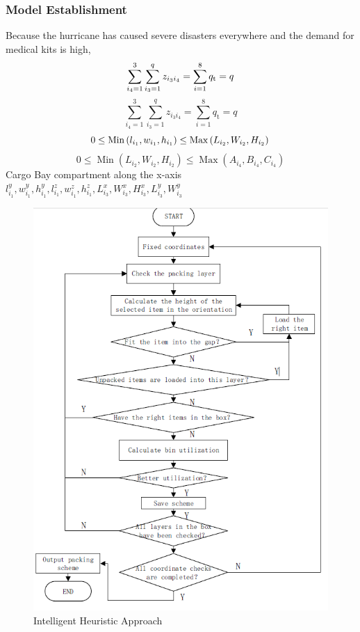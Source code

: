 \documentclass[a4paper,12pt]{article}
\begin{document}
	\subsubsection{Model Establishment}
	Because the hurricane has caused severe disasters everywhere and the demand for medical
	kits is high,
	\begin{equation}
	\sum_{i_{4}=1}^{3} \sum_{i_{3}=1}^{q} z_{i_{3} i_{4}}=\sum_{i=1}^{8} q_{\mathrm{t}}=q\\
	\end{equation}
	\begin{equation}
	\sum_{i_{4}=1}^{3} \sum_{i_{3}=1}^{q} z_{i_{3} i_{4}}=\sum_{i=1}^{8} q_{\mathrm{t}}=q
	\end{equation}
		\begin{equation}
		0 \leq \operatorname{Min}\left(l_{i_{1}}, w_{i_{1}}, h_{i_{1}}\right) \leq \operatorname{Max}\left(L_{i_{2}}, W_{i_{2}}, H_{i_{2}}\right)\\
	\end{equation}
	\begin{equation}
	0 \leq \operatorname{Min}\left(L_{i_{2}}, W_{i_{2}}, H_{i_{2}}\right) \leq \operatorname{Max}\left(A_{i_{4}}, B_{i_{4}}, C_{i_{4}}\right)
	\end{equation}
	Cargo Bay compartment along the x-axis $l_{i_{1}}^{y}, w_{i_{1}}^{y}, h_{i_{1}}^{y}, l_{i_{1}}^{z}, w_{i_{1}}^{z}, h_{i_{1}}^{z}, L_{i_{3}}^{x}, W_{i_{3}}^{x}, H_{i_{3}}^{x}, L_{i_{3}}^{y}, W_{i_{3}}^{y}$
	\begin{figure}
		\centering
		\includegraphics[width=0.7\linewidth]{3}
		\caption{Intelligent Heuristic Approach}
		\label{fig:3}
	\end{figure}
\end{document}
